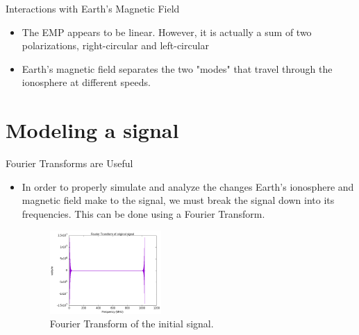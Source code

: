 \documentclass[10pt, aspectratio=168]{beamer}
\begin{document}
    \begin{frame}{Interactions with Earth's Magnetic Field}
    \begin{itemize}
        \item \Large The EMP appears to be linear. However, it is actually a sum of two polarizations,
        right-circular and left-circular
        \item Earth's magnetic field separates the two "modes" that travel through the ionosphere at different speeds.
    \end{itemize}
    \end{frame}
    

\section{Modeling a signal}

    \begin{frame}{Fourier Transforms are Useful}
    \begin{itemize}
        \item In order to properly simulate and analyze the changes Earth's ionosphere and magnetic field make to the signal, we must break the signal down into its frequencies.
This can be done using a Fourier Transform.
        \begin{figure}[h]
            \centering
            \includegraphics[width=0.4\textwidth]{fft_original_signal.png}
            \caption{Fourier Transform of the initial signal.}
            \label{fig:ft-original-signal}
        \end{figure}
    \end{itemize}
    \end{frame}
    
\end{document}
